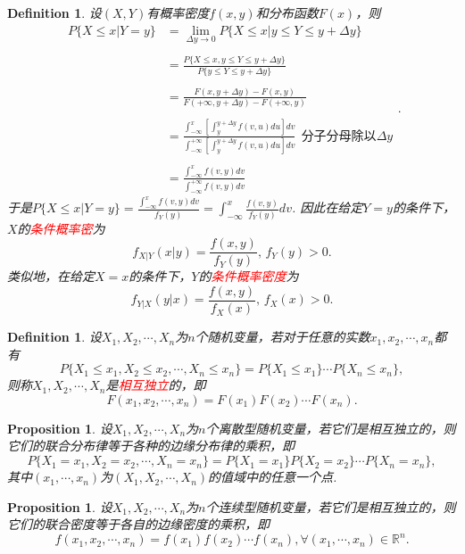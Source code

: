 \documentclass{article}
\newtheorem{proposition}[theorem]{Proposition}
\newtheorem{definition}[theorem]{Definition}
\newcommand{\redt}[1]{\textcolor{red}{#1}}
\begin{document}
\begin{definition}
\rm 设$(X,Y)$有概率密度$f(x,y)$和分布函数$F(x)$，则
$$
\begin{array}{ll}
P\{X \leq x|Y = y\} &= \lim\limits_{\Delta y \to 0}P\{X \leq x|y \leq Y \leq y+\Delta y\} \\ \\
&= \frac{P\{X \leq x, y \leq Y \leq y+\Delta y\}}{P\{y \leq Y \leq y+\Delta y\}} \\ \\
&= \frac{F(x,y+\Delta y)-F(x,y)}{F(+\infty,y+\Delta y)-F(+\infty, y)} \\ \\
&= \frac{\int_{-\infty}^{x}\left[\int_{y}^{y +\Delta y}f(v,u)du\right]dv}{\int^{+\infty}_{-\infty} \left[\int_{y}^{y + \Delta y} f(v,u)du\right]dv} ~~ \text{分子分母除以$\Delta y$} \\ \\
&= \frac{\int_{-\infty}^{x}f(v,y)dv}{\int^{+\infty}_{-\infty} f(v,y)dv}
\end{array}.
$$
于是$P\{X \leq x|Y = y\}= \frac{\int_{-\infty}^{x}f(v,y)dv}{f_Y(y)} = \int_{-\infty}^{x}\frac{f(v,y)}{f_Y(y)}dv$. 因此在给定$Y=y$的条件下，$X$的\redt{条件概率密}为
$$
f_{X|Y}(x|y) = \frac{f(x,y)}{f_Y(y)}, \, f_Y(y) > 0.
$$
类似地，在给定$X=x$的条件下，$Y$的\redt{条件概率密度}为
$$
f_{Y|X}(y|x) = \frac{f(x,y)}{f_X(x)}, \, f_X(x) > 0.
$$
\end{definition}


\begin{definition}
\rm 设$X_1,X_2,\cdots,X_n$为$n$个随机变量，若对于任意的实数$x_1,x_2,\cdots,x_n$都有
$$
P\{X_1 \leq x_1, X_2 \leq x_2 ,\cdots, X_n \leq x_n\} = P\{X_1 \leq x_1\} \cdots P\{X_n \leq x_n\},
$$
则称$X_1,X_2,\cdots,X_n$是\redt{相互独立}的，即
$$
F(x_1,x_2,\cdots,x_n) = F(x_1)F(x_2)\cdots F(x_n). 
$$
\end{definition}

\begin{proposition}
\rm 设$X_1,X_2,\cdots,X_n$为$n$个离散型随机变量，若它们是相互独立的，则它们的联合分布律等于各种的边缘分布律的乘积，即
$$
P\{X_1 = x_1, X_2 = x_2 , \cdots, X_n = x_n\} = P\{X_1 = x_1\}P\{X_2 = x_2\}\cdots P\{X_n = x_n\},
$$
其中$(x_1,\cdots,x_n)$为$(X_1,X_2,\cdots,X_n)$的值域中的任意一个点. 
\end{proposition}

\begin{proposition}
\rm 设$X_1,X_2,\cdots,X_n$为$n$个连续型随机变量，若它们是相互独立的，则它们的联合密度等于各自的边缘密度的乘积，即
$$
f(x_1,x_2,\cdots,x_n) = f(x_1)f(x_2)\cdots f(x_n), \forall (x_1,\cdots,x_n) \in \mathbb{R}^n.
$$
\end{proposition}
\end{document}
